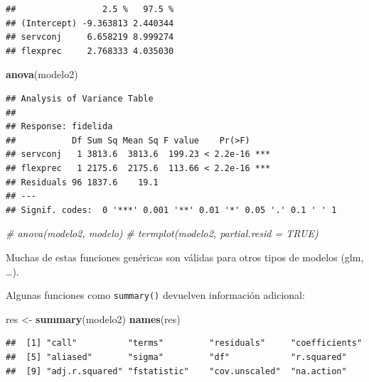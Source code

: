 \documentclass[]{book}
\newenvironment{Shaded}{\begin{snugshade}}{\end{snugshade}}
\newcommand{\KeywordTok}[1]{\textcolor[rgb]{0.13,0.29,0.53}{\textbf{#1}}}
\newcommand{\StringTok}[1]{\textcolor[rgb]{0.31,0.60,0.02}{#1}}
\newcommand{\CommentTok}[1]{\textcolor[rgb]{0.56,0.35,0.01}{\textit{#1}}}
\newcommand{\OperatorTok}[1]{\textcolor[rgb]{0.81,0.36,0.00}{\textbf{#1}}}
\newcommand{\NormalTok}[1]{#1}
\begin{document}
\begin{verbatim}
##                 2.5 %   97.5 %
## (Intercept) -9.363813 2.440344
## servconj     6.658219 8.999274
## flexprec     2.768333 4.035030
\end{verbatim}

\begin{Shaded}
\begin{Highlighting}[]
\KeywordTok{anova}\NormalTok{(modelo2)}
\end{Highlighting}
\end{Shaded}

\begin{verbatim}
## Analysis of Variance Table
## 
## Response: fidelida
##           Df Sum Sq Mean Sq F value    Pr(>F)    
## servconj   1 3813.6  3813.6  199.23 < 2.2e-16 ***
## flexprec   1 2175.6  2175.6  113.66 < 2.2e-16 ***
## Residuals 96 1837.6    19.1                      
## ---
## Signif. codes:  0 '***' 0.001 '**' 0.01 '*' 0.05 '.' 0.1 ' ' 1
\end{verbatim}

\begin{Shaded}
\begin{Highlighting}[]
\CommentTok{# anova(modelo2, modelo)}
\CommentTok{# termplot(modelo2, partial.resid = TRUE)}
\end{Highlighting}
\end{Shaded}

Muchas de estas funciones genéricas son válidas para otros tipos de
modelos (glm, \ldots{}).

Algunas funciones como \texttt{summary()} devuelven información
adicional:

\begin{Shaded}
\begin{Highlighting}[]
\NormalTok{res <-}\StringTok{ }\KeywordTok{summary}\NormalTok{(modelo2)}
\KeywordTok{names}\NormalTok{(res)}
\end{Highlighting}
\end{Shaded}

\begin{verbatim}
##  [1] "call"          "terms"         "residuals"     "coefficients" 
##  [5] "aliased"       "sigma"         "df"            "r.squared"    
##  [9] "adj.r.squared" "fstatistic"    "cov.unscaled"  "na.action"
\end{verbatim}

\begin{Shaded}
\end{Shaded}
\end{document}
